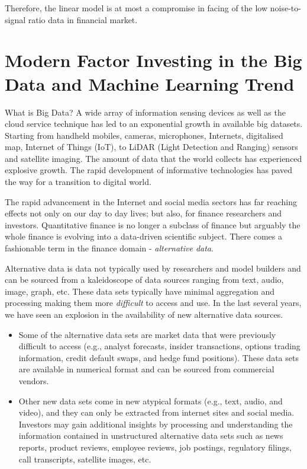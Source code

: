 \documentclass[
]{book}
\begin{document}
Therefore, the linear model is at most a compromise in facing of the low noise-to-signal ratio data in financial market.

\hypertarget{modern-factor-investing-in-the-big-data-and-machine-learning-trend}{%
\section{Modern Factor Investing in the Big Data and Machine Learning Trend}\label{modern-factor-investing-in-the-big-data-and-machine-learning-trend}}

What is Big Data? A wide array of information sensing devices as well as the cloud service technique has led to an exponential growth in available big datasets. Starting from handheld mobiles, cameras, microphones, Internets, digitalised map, Internet of Things (IoT), to LiDAR (Light Detection and Ranging) sensors and satellite imaging. The amount of data that the world collects has experienced explosive growth. The rapid development of informative technologies has paved the way for a transition to digital world.

The rapid advancement in the Internet and social media sectors has far reaching effects not only on our day to day lives; but also, for finance researchers and investors. Quantitative finance is no longer a subclass of finance but arguably the whole finance is evolving into a data-driven scientific subject. There comes a fashionable term in the finance domain - {\emph{alternative data}}.

Alternative data is data not typically used by researchers and model builders and can be sourced from a kaleidoscope of data sources ranging from text, audio, image, graph, etc. These data sets typically have minimal aggregation and processing making them more {\emph{difficult}} to access and use. In the last several years, we have seen an explosion in the availability of new alternative data sources.

\begin{itemize}
\item
  Some of the alternative data sets are market data that were previously difficult to access (e.g., analyst forecasts, insider transactions, options trading information, credit default swaps, and hedge fund positions). These data sets are available in numerical format and can be sourced from commercial vendors.
\item
  Other new data sets come in new atypical formats (e.g., text, audio, and video), and they can only be extracted from internet sites and social media. Investors may gain additional insights by processing and understanding the information contained in unstructured alternative data sets such as news reports, product reviews, employee reviews, job postings, regulatory filings, call transcripts, satellite images, etc.
\end{itemize}
\end{document}
